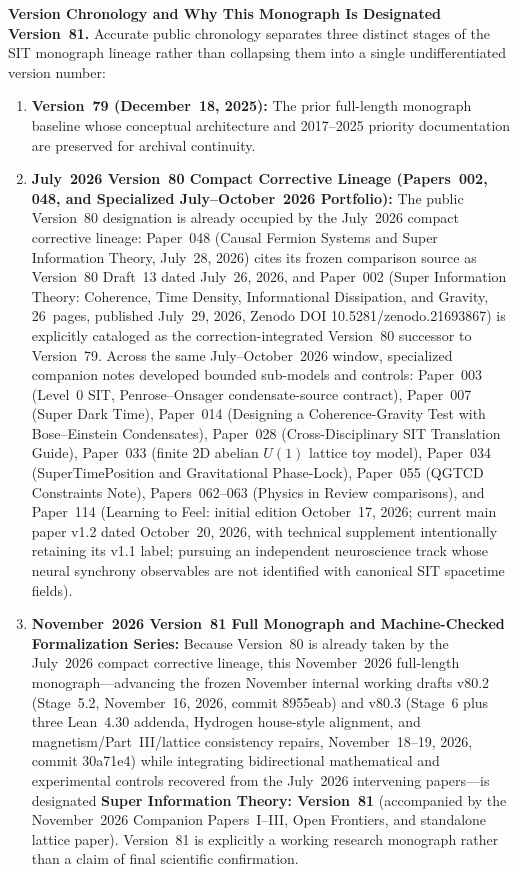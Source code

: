 \documentclass[american,11pt,letterpaper]{article}
\def\texttt#1{#1}%
\def\emph#1{#1}%
\begin{document}
\textbf{Version Chronology and Why This Monograph Is Designated Version~81.} Accurate public chronology separates three distinct stages of the SIT monograph lineage rather than collapsing them into a single undifferentiated version number:
\begin{enumerate}[leftmargin=2em]
  \item \textbf{Version~79 (December~18, 2025):} The prior full-length monograph baseline whose conceptual architecture and 2017--2025 priority documentation are preserved for archival continuity.
  \item \textbf{July~2026 Version~80 Compact Corrective Lineage (Papers~002, 048, and Specialized July--October~2026 Portfolio):} The public Version~80 designation is already occupied by the July~2026 compact corrective lineage: Paper~048 (\emph{Causal Fermion Systems and Super Information Theory}, July~28, 2026) cites its frozen comparison source as \emph{Version~80 Draft~13} dated July~26, 2026, and Paper~002 (\emph{Super Information Theory: Coherence, Time Density, Informational Dissipation, and Gravity}, 26~pages, published July~29, 2026, Zenodo DOI \texttt{10.5281/zenodo.21693867}) is explicitly cataloged as the correction-integrated Version~80 successor to Version~79. Across the same July--October~2026 window, specialized companion notes developed bounded sub-models and controls: Paper~003 (\emph{Level~0 SIT}, Penrose--Onsager condensate-source contract), Paper~007 (\emph{Super Dark Time}), Paper~014 (\emph{Designing a Coherence-Gravity Test with Bose--Einstein Condensates}), Paper~028 (\emph{Cross-Disciplinary SIT Translation Guide}), Paper~033 (finite 2D abelian $U(1)$ lattice toy model), Paper~034 (\emph{SuperTimePosition and Gravitational Phase-Lock}), Paper~055 (\emph{QGTCD Constraints Note}), Papers~062--063 (\emph{Physics in Review} comparisons), and Paper~114 (\emph{Learning to Feel}: initial edition October~17, 2026; current main paper v1.2 dated October~20, 2026, with technical supplement intentionally retaining its v1.1 label; pursuing an independent neuroscience track whose neural synchrony observables are not identified with canonical SIT spacetime fields).
  \item \textbf{November~2026 Version~81 Full Monograph and Machine-Checked Formalization Series:} Because Version~80 is already taken by the July~2026 compact corrective lineage, this November~2026 full-length monograph---advancing the frozen November internal working drafts v80.2 (Stage~5.2, November~16, 2026, commit \texttt{8955eab}) and v80.3 (Stage~6 plus three Lean~4.30 addenda, Hydrogen house-style alignment, and magnetism/Part~III/lattice consistency repairs, November~18--19, 2026, commit \texttt{30a71e4}) while integrating bidirectional mathematical and experimental controls recovered from the July~2026 intervening papers---is designated \textbf{Super Information Theory: Version~81} (accompanied by the November~2026 Companion Papers~I--III, Open Frontiers, and standalone lattice paper). Version~81 is explicitly a working research monograph rather than a claim of final scientific confirmation.
\end{enumerate}
\end{document}
